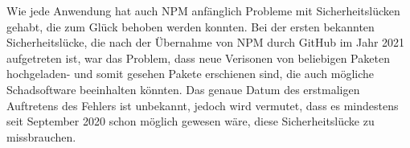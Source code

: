 Wie jede Anwendung hat auch NPM anfänglich Probleme mit Sicherheitslücken gehabt, die zum Glück behoben werden konnten. Bei der ersten bekannten Sicherheitslücke, die nach der Übernahme von NPM durch GitHub im Jahr 2021 aufgetreten ist, war das Problem, dass neue Verisonen von beliebigen Paketen hochgeladen- und somit gesehen Pakete erschienen sind, die auch mögliche Schadsoftware beeinhalten könnten. Das genaue Datum des erstmaligen Auftretens des Fehlers ist unbekannt, jedoch wird vermutet, dass es mindestens seit September 2020 schon möglich gewesen wäre, diese Sicherheitslücke zu missbrauchen. \cite{NPMSecurity}


